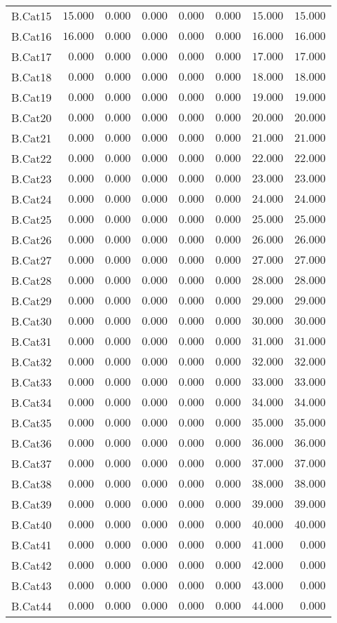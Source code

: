 \documentclass[6pt]{article}
\begin{document}
{\begin{longtable}{lrrrrrrr}
B.Cat15&$15.000$&$ 0.000$&$ 0.000$&$ 0.000$&$ 0.000$&$ 15.000$&$15.000$\tabularnewline
B.Cat16&$16.000$&$ 0.000$&$ 0.000$&$ 0.000$&$ 0.000$&$ 16.000$&$16.000$\tabularnewline
B.Cat17&$ 0.000$&$ 0.000$&$ 0.000$&$ 0.000$&$ 0.000$&$ 17.000$&$17.000$\tabularnewline
B.Cat18&$ 0.000$&$ 0.000$&$ 0.000$&$ 0.000$&$ 0.000$&$ 18.000$&$18.000$\tabularnewline
B.Cat19&$ 0.000$&$ 0.000$&$ 0.000$&$ 0.000$&$ 0.000$&$ 19.000$&$19.000$\tabularnewline
B.Cat20&$ 0.000$&$ 0.000$&$ 0.000$&$ 0.000$&$ 0.000$&$ 20.000$&$20.000$\tabularnewline
B.Cat21&$ 0.000$&$ 0.000$&$ 0.000$&$ 0.000$&$ 0.000$&$ 21.000$&$21.000$\tabularnewline
B.Cat22&$ 0.000$&$ 0.000$&$ 0.000$&$ 0.000$&$ 0.000$&$ 22.000$&$22.000$\tabularnewline
B.Cat23&$ 0.000$&$ 0.000$&$ 0.000$&$ 0.000$&$ 0.000$&$ 23.000$&$23.000$\tabularnewline
B.Cat24&$ 0.000$&$ 0.000$&$ 0.000$&$ 0.000$&$ 0.000$&$ 24.000$&$24.000$\tabularnewline
B.Cat25&$ 0.000$&$ 0.000$&$ 0.000$&$ 0.000$&$ 0.000$&$ 25.000$&$25.000$\tabularnewline
B.Cat26&$ 0.000$&$ 0.000$&$ 0.000$&$ 0.000$&$ 0.000$&$ 26.000$&$26.000$\tabularnewline
B.Cat27&$ 0.000$&$ 0.000$&$ 0.000$&$ 0.000$&$ 0.000$&$ 27.000$&$27.000$\tabularnewline
B.Cat28&$ 0.000$&$ 0.000$&$ 0.000$&$ 0.000$&$ 0.000$&$ 28.000$&$28.000$\tabularnewline
B.Cat29&$ 0.000$&$ 0.000$&$ 0.000$&$ 0.000$&$ 0.000$&$ 29.000$&$29.000$\tabularnewline
B.Cat30&$ 0.000$&$ 0.000$&$ 0.000$&$ 0.000$&$ 0.000$&$ 30.000$&$30.000$\tabularnewline
B.Cat31&$ 0.000$&$ 0.000$&$ 0.000$&$ 0.000$&$ 0.000$&$ 31.000$&$31.000$\tabularnewline
B.Cat32&$ 0.000$&$ 0.000$&$ 0.000$&$ 0.000$&$ 0.000$&$ 32.000$&$32.000$\tabularnewline
B.Cat33&$ 0.000$&$ 0.000$&$ 0.000$&$ 0.000$&$ 0.000$&$ 33.000$&$33.000$\tabularnewline
B.Cat34&$ 0.000$&$ 0.000$&$ 0.000$&$ 0.000$&$ 0.000$&$ 34.000$&$34.000$\tabularnewline
B.Cat35&$ 0.000$&$ 0.000$&$ 0.000$&$ 0.000$&$ 0.000$&$ 35.000$&$35.000$\tabularnewline
B.Cat36&$ 0.000$&$ 0.000$&$ 0.000$&$ 0.000$&$ 0.000$&$ 36.000$&$36.000$\tabularnewline
B.Cat37&$ 0.000$&$ 0.000$&$ 0.000$&$ 0.000$&$ 0.000$&$ 37.000$&$37.000$\tabularnewline
B.Cat38&$ 0.000$&$ 0.000$&$ 0.000$&$ 0.000$&$ 0.000$&$ 38.000$&$38.000$\tabularnewline
\newpage
B.Cat39&$ 0.000$&$ 0.000$&$ 0.000$&$ 0.000$&$ 0.000$&$ 39.000$&$39.000$\tabularnewline
B.Cat40&$ 0.000$&$ 0.000$&$ 0.000$&$ 0.000$&$ 0.000$&$ 40.000$&$40.000$\tabularnewline
B.Cat41&$ 0.000$&$ 0.000$&$ 0.000$&$ 0.000$&$ 0.000$&$ 41.000$&$ 0.000$\tabularnewline
B.Cat42&$ 0.000$&$ 0.000$&$ 0.000$&$ 0.000$&$ 0.000$&$ 42.000$&$ 0.000$\tabularnewline
B.Cat43&$ 0.000$&$ 0.000$&$ 0.000$&$ 0.000$&$ 0.000$&$ 43.000$&$ 0.000$\tabularnewline
B.Cat44&$ 0.000$&$ 0.000$&$ 0.000$&$ 0.000$&$ 0.000$&$ 44.000$&$ 0.000$\tabularnewline

\end{longtable}}
\end{document}
